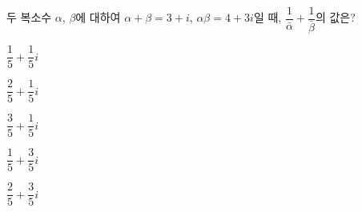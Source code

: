 두 복소수 $\alpha$, $\beta$에 대하여 $\alpha+\beta=3+i$, $\alpha\beta=4+3i$일 때, $\dfrac{1}{\bar{\alpha}}+\dfrac{1}{\bar{\beta}}$의 값은? 
\begin{choices32}{\rule[-3ex]{0pt}{8ex}$\dfrac{1}{5}+\dfrac{1}{5}i$}{\rule[-3ex]{0pt}{8ex}$\dfrac{2}{5}+\dfrac{1}{5}i$}{\rule[-3ex]{0pt}{8ex}$\dfrac{3}{5}+\dfrac{1}{5}i$}{\rule[-3ex]{0pt}{8ex}$\dfrac{1}{5}+\dfrac{3}{5}i$}{\rule[-3ex]{0pt}{8ex}$\dfrac{2}{5}+\dfrac{3}{5}i$}\end{choices32}
